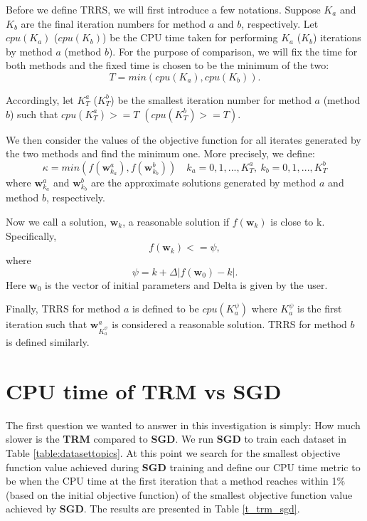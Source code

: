 \documentclass[letterpaper,12pt,titlepage,oneside,final]{book}
\begin{document}
	Before we define TRRS, we will first introduce a few notations. Suppose $K_{a}$ and $K_{b}$ are the final iteration numbers for method $a$ and $b$, respectively. Let $cpu(K_{a})$ ($cpu(K_{b})$) be the CPU time taken for performing $K_{a}$ ($K_{b}$) iterations by method $a$ (method $b$). For the purpose of comparison, we will fix the time for both methods and the fixed time is chosen to be the minimum of the two:
	\begin{equation}
	T = min(cpu(K_{a}), cpu(K_{b})).
	\end{equation}
	
	Accordingly, let $K_{T}^{a}$ ($K_{T}^{b}$) be the smallest iteration number for method $a$ (method $b$) such that $cpu(K_{T}^{a}) >= T$ $(cpu(K_{T}^{b}) >= T)$. 
	
	We then consider the values of the objective function for all iterates generated by the two methods and find the minimum one. More precisely, we define:
	\begin{equation}
	\kappa = min(f(\mathbf{w}_{k_{a}}^a), f(\mathbf{w}_{k_{b}}^b))       \quad k_{a} = 0, 1, ..., K_{T}^{a}, \  k_{b} = 0, 1, ..., K_{T}^{b}
	\end{equation}
	where $\mathbf{w}_{k_{a}}^{a}$ and $\mathbf{w}_{k_{b}}^{b}$ are the approximate solutions generated by method $a$ and method $b$, respectively.
	
	Now we call a solution, $\mathbf{w}_{k}$, a reasonable solution if $f(\mathbf{w}_{k})$ is close to k. Specifically,
	\begin{equation}
	f(\mathbf{w}_{k}) <= \psi,
	\end{equation}
	where
	\begin{equation}
	\psi = k + \Delta |f(\mathbf{w}_0) - k|.
	\end{equation}	
	Here $\mathbf{w}_{0}$ is the vector of initial parameters and Delta is given by the user.
	
	Finally, TRRS for method $a$ is defined to be $cpu(K_{a}^{\psi})$ where $K_{a}^{\psi}$ is the first iteration such that $\mathbf{w}_{K_{a}^{\psi}}^a$ is considered a reasonable solution. TRRS for method $b$ is defined similarly.
		
	\section{CPU time of TRM vs SGD}
	
	The first question we wanted to answer in this investigation is simply: How much slower is the \textbf{TRM} compared to \textbf{SGD}. We run \textbf{SGD} to train each dataset in Table \ref{table:datasettopics}. At this point we search for the smallest objective function value achieved during \textbf{SGD} training and define our CPU time metric to be when the CPU time at the first iteration that a method reaches within 1\% (based on the initial objective function) of the smallest objective function value achieved by \textbf{SGD}. The results are presented in Table \ref{t_trm_sgd}. 
	
\end{document}
